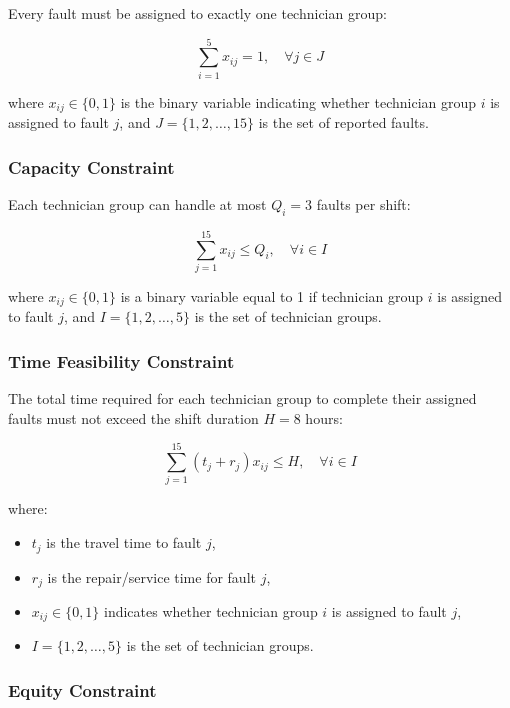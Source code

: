 \documentclass[11pt]{article}
\begin{document}
Every fault must be assigned to exactly one technician group:

\begin{equation}
\sum_{i=1}^{5} x_{ij} = 1, \quad \forall j \in J
\end{equation}

where $x_{ij} \in \{0,1\}$ is the binary variable indicating whether technician group $i$ is assigned to fault $j$, and $J = \{1, 2, \dots, 15\}$ is the set of reported faults.



\subsubsection*{Capacity Constraint}

Each technician group can handle at most $Q_i = 3$ faults per shift:

\begin{equation}
\sum_{j=1}^{15} x_{ij} \leq Q_i, \quad \forall i \in I
\end{equation}

where $x_{ij} \in \{0,1\}$ is a binary variable equal to 1 if technician group $i$ is assigned to fault $j$, and $I = \{1, 2, \dots, 5\}$ is the set of technician groups.


\subsubsection*{Time Feasibility Constraint}

The total time required for each technician group to complete their assigned faults must not exceed the shift duration $H = 8$ hours:

\begin{equation}
\sum_{j=1}^{15} (t_j + r_j) x_{ij} \leq H, \quad \forall i \in I
\end{equation}

where:
\begin{itemize}
    \item $t_j$ is the travel time to fault $j$,
    \item $r_j$ is the repair/service time for fault $j$,
    \item $x_{ij} \in \{0,1\}$ indicates whether technician group $i$ is assigned to fault $j$,
    \item $I = \{1, 2, \dots, 5\}$ is the set of technician groups.
\end{itemize}


\subsubsection*{Equity Constraint}
\end{document}
